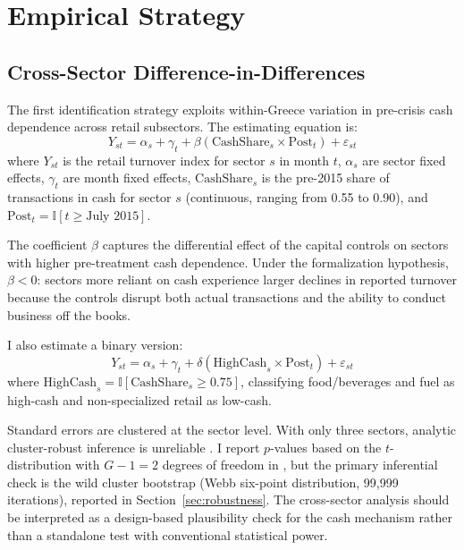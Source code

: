 \documentclass[12pt]{article}
\newcommand{\ind}{\mathbb{I}}
\begin{document}
\section{Empirical Strategy}
\label{sec:strategy}

\subsection{Cross-Sector Difference-in-Differences}

The first identification strategy exploits within-Greece variation in pre-crisis cash dependence across retail subsectors. The estimating equation is:
\begin{equation}
    Y_{st} = \alpha_s + \gamma_t + \beta \left( \text{CashShare}_s \times \text{Post}_t \right) + \varepsilon_{st}
    \label{eq:did}
\end{equation}
where $Y_{st}$ is the retail turnover index for sector $s$ in month $t$, $\alpha_s$ are sector fixed effects, $\gamma_t$ are month fixed effects, $\text{CashShare}_s$ is the pre-2015 share of transactions in cash for sector $s$ (continuous, ranging from 0.55 to 0.90), and $\text{Post}_t = \ind[t \geq \text{July 2015}]$.

The coefficient $\beta$ captures the differential effect of the capital controls on sectors with higher pre-treatment cash dependence. Under the formalization hypothesis, $\beta < 0$: sectors more reliant on cash experience larger declines in reported turnover because the controls disrupt both actual transactions and the ability to conduct business off the books.

I also estimate a binary version:
\begin{equation}
    Y_{st} = \alpha_s + \gamma_t + \delta \left( \text{HighCash}_s \times \text{Post}_t \right) + \varepsilon_{st}
    \label{eq:did_binary}
\end{equation}
where $\text{HighCash}_s = \ind[\text{CashShare}_s \geq 0.75]$, classifying food/beverages and fuel as high-cash and non-specialized retail as low-cash.

Standard errors are clustered at the sector level. With only three sectors, analytic cluster-robust inference is unreliable \citep{cameron2008bootstrap}. I report $p$-values based on the $t$-distribution with $G-1 = 2$ degrees of freedom in , but the primary inferential check is the wild cluster bootstrap (Webb six-point distribution, 99{,}999 iterations), reported in Section~\ref{sec:robustness}. The cross-sector analysis should be interpreted as a design-based plausibility check for the cash mechanism rather than a standalone test with conventional statistical power.
\end{document}
